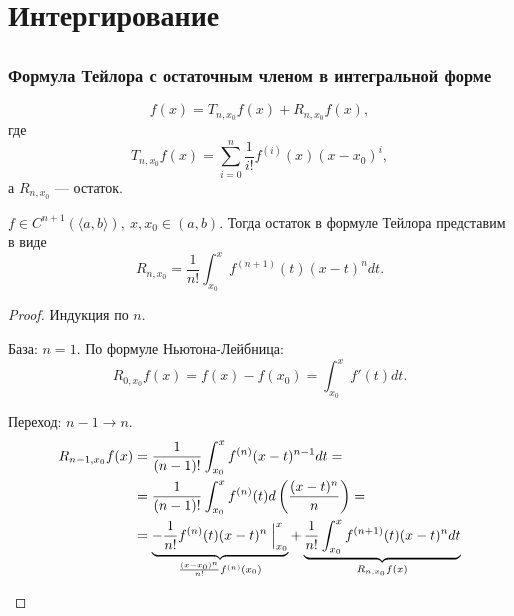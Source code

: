 \documentclass[11pt,dvipsnames]{report}
\begin{document}
\tableofcontents

\chapter{Интергирование}
\section{}

\subsection{Формула Тейлора с остаточным членом в интегральной форме}
\[
    f(x)  = T_{n, x_0} f(x) + R_{n, x_0} f(x) 
,\] 
где 
\[
    T_{n, x_0} f(x) = \sum_{i=0}^{n} \frac{1}{i!} f^{(i)}(x) (x-x_0)^{i}
,\] 
а $ R_{n, x_0}$ --- остаток.
\begin{thm}
    $ f \in  C^{n+1} (\langle a, b \rangle), ~ x, x_0 \in  (a, b)$. Тогда остаток в формуле Тейлора представим в виде
    \[
	R_{n, x_0} =\frac{1}{n!} \int_{x_0}^{x} f^{(n+1)}(t) (x-t)^{n} dt 
    .\] 
\end{thm}
\begin{proof}
    Индукция по $n$.
    $ $
    \begin{description}
        \item База: $ n=1$. 
	    По формуле Ньютона-Лейбница:
	    \[
		R_{0, x_0} f(x) = f(x) - f(x_0) = \int_{x_0}^{x} f'(t) dt 
	    .\] 
        \item Переход: $ n-1 \to n$. 
	    \begin{align*}
		R_{n-1, x_0} f(x) &= \frac{1}{(n-1)!} \int_{x_0}^{x} f^{(n)}(x-t)^{n-1}dt = \\
				  & = \frac{1}{(n-1)!} \int_{x_0}^{x}  f^{(n)}(t) d \left( \frac{(x-t)^{n}}{n} \right)  = \\
				  & = \underbrace{-\frac{1}{n!} f^{(n)}(t)(x-t)^{n} \Bigm |_{x_0}^{x}}_{\frac{(x-x_0)^{n}}{n!} f^{(n)}(x_0)} + \underbrace{\frac{1}{n!}  \int_{x_0}^{x} f^{(n+1)}(t) (x-t)^{n}dt}_{R_{n, x_0}f(x)}
	    \end{align*}
    \end{description} 
\end{proof}
\end{document}
